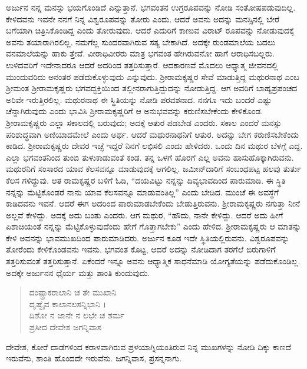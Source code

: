 ಅರ್ಜುನ ನನ್ನ ಮನಸ್ಸು ಭಯಗೊಂಡಿದೆ ಎನ್ನುತ್ತಾನೆ. ಭಗವಂತನ ಉಗ್ರರೂಪವನ್ನು ನೋಡಿ ಸಂತೋಷಪಡುವುದಿಲ್ಲ. ಕೇಳಿದವನು ಇವನೇ ನನಗೆ ನಿನ್ನ ವಿಶ್ವರೂಪವನ್ನು ತೋರು ಎಂದು. ಆದರೆ ಅವನು ಅದನ್ನು ಮನಸ್ಸಿನಲ್ಲಿ ಬೇರೆ ಬಗೆಯಾಗಿ ಚಿತ್ರಿಸಿಕೊಂಡಿದ್ದ ಎಂದು ತೋರುವುದು. ಆದರೆ ಎದುರಿಗೆ ಕಾಣುವ ವಿರಾಟ್ ರೂಪವನ್ನು ನೋಡುವುದಕ್ಕೆ ಅವನು ತಯಾರಾಗಿರಲಿಲ್ಲ. ನಮಗೆಲ್ಲ ಸುಂದರವಾಗಿರುವ ಸತ್ಯ ಬೇಕಾಗಿದೆ. ಅದಕ್ಕೇ ರುಂಡಮಾಲೆಯ ಬದಲು ವನಮಾಲೆಯನ್ನು ಹಾಕು ತ್ತೇವೆ. ವೀರಾಧಿವೀರರು ಮಾತ್ರ ಭಗವಂತ ಹೇಗಿರುವನೋ ಹಾಗೆ ಆರಾಧಿಸಬಲ್ಲರು. ಉಳಿದವರಿಗೆ ಇದೇನಾದರೂ ಆದರೆ ಅದರಿಂದ ತತ್ತರಿಸುತ್ತಾರೆ. ಆದಕಾರಣವೆ ಮೊದಲು ಆಧ್ಯಾತ್ಮ ಜೀವನದಲ್ಲಿ ಮುಂದುವರಿದು ಅನಂತರ ಪಡೆದುಕೊಳ್ಳುವುದು ಎನ್ನುವುದು. ಶ್ರೀರಾಮಕೃಷ್ಣರ ಸೇವೆ ಮಾಡುತ್ತಿದ್ದ ಮಥುರನಾಥ ಎಂಬ ಶ್ರೀಮಂತ ಶ್ರೀರಾಮಕೃಷ್ಣರು ಭಗವದ್ಭಕ್ತಿಯಿಂದ ತಲ್ಲೀನರಾಗುತ್ತಿದ್ದುದನ್ನು ನೋಡುತ್ತಿದ್ದ. ಆಗ ಅವರಿಗೆ ಬಾಹ್ಯಪ್ರಪಂಚದ ಅರಿವೇ ಇರುತ್ತಿರಲಿಲ್ಲ. ಮಥುರನಾಥ ಈ ಸ್ಥಿತಿಯನ್ನು ನೋಡಿ ಪರವಶನಾದ. ನನಗೂ ಇದು ಬಂದರೆ ಎಷ್ಟು ಚೆನ್ನಾಗಿರುವುದು ಎಂದು ಭಾವಿಸಿ ಶ್ರೀರಾಮಕೃಷ್ಣರಿಗೆ ಆ ಅನುಭವವನ್ನು ಕರುಣಿಸಬೇಕೆಂದು ಕೇಳಿಕೊಂಡ. ಶ್ರೀರಾಮಕೃಷ್ಣರು ಎಲ್ಲಾ ಸಕಾಲದಲ್ಲಿ ಬರುವುದು; ಅದಕ್ಕೆ ಆತುರ ಪಡಬೇಡ ಎಂದರು. ಸಕಾಲ ಎಂದರೆ ಮನಸ್ಸು ಪರಿಶುದ್ಧವಾಗಿ ಅಣಿಯಾದಮೇಲೆ ಎಂದು ಅರ್ಥ. ಆದರೆ ಮಥುರನಾಥನಿಗೆ ಆತುರ. ಅದನ್ನು ಬೇಗ ಕರುಣಿಸಬೇಕೆಂದು ಕಾಡಿದ. ಶ್ರೀರಾಮಕೃಷ್ಣರು ದೇವರ ಇಚ್ಛೆ ಇದ್ದರೆ ನಿನಗೆ ಲಭಿಸಲಿ ಎಂದು ಹೇಳಿದರು. ಒಂದು ದಿನ ಮಥುರ ಬೆಳಗ್ಗೆ ಎದ್ದ. ಎಲ್ಲಾ ಭಗವಂತನಿಂದ ತುಂಬಿ ತುಳುಕಾಡುವಂತೆ ಕಂಡ. ತನ್ನ ಒಳಗೆ ಹೊರಗೆ ಎಲ್ಲ ಅವನು ಹಾಸುಹೊಕ್ಕಾಗಿರುವನು. ಮಥುರನಿಗೆ ಸಂಸಾರದ ಯಾವ ಕೆಲಸವನ್ನೂ ಮಾಡುವುದಕ್ಕೆ ಆಗಲಿಲ್ಲ. ಜಮೀನ್​ದಾರಿಗೆ ಸಂಬಂಧಪಟ್ಟ ಹಲವು ತುರ್ತು ಕೆಲಸ ಗಳಿದ್ದುವು. ಆತ ರಾಮಕೃಷ್ಣರ ಬಳಿಗೆ ಓಡಿ, “ದಯವಿಟ್ಟು ನನ್ನನ್ನು ದಿವ್ಯಭಾವದಿಂದ ಪಾರುಮಾಡಿ. ಈ ಸ್ಥಿತಿ ನನ್ನನ್ನು ಮೆಟ್ಟಿಕೊಂಡರೆ ನಾನು ಯಾವ ಕೆಲಸವನ್ನೂ ಮಾಡುವಂತಿಲ್ಲ” ಎಂದು ಬೇಡಿದ. ಮುಂಚೆ ಈ ಅವಸ್ಥೆಗೆ ಕಾಡಿದವನು ಇವನೆ. ಆದರೆ ಈಗ ಅದರಿಂದ ಪಾರುಮಾಡಬೇಕೆಂದು ಬೇಡುತ್ತಿರುವನು. ಶ್ರೀರಾಮಕೃಷ್ಣರು ನಗುತ್ತಾ ನೀನೆ ಅಲ್ಲವೆ ಕೇಳಿದ್ದು. ಅದಕ್ಕೆ ಅದು ಬಂತು ಎಂದರು. ಆಗ ಮಥುರ, “ಹೌದು, ನಾನೇ ಕೇಳಿದ್ದು. ಆದರೆ ಅದು ಹೀಗೆ ಪಿಶಾಚಿಯಂತೆ ನನ್ನನ್ನು ಮೆಟ್ಟಿಕೊಳ್ಳುವುದೆಂದು ಹೇಗೆ ಗೊತ್ತಾಗಬೇಕು” ಎಂದು ಹೇಳಿದ. ಶ್ರೀರಾಮಕೃಷ್ಣರು ಆ ಮಾತನ್ನು ಕೇಳಿ ಅವನನ್ನು ಭಾವಮುಖದಿಂದ ಪಾರುಮಾಡಿದರು. ಅರ್ಜುನ ಕೂಡ ಇದೇ ಸ್ಥಿತಿಯಲ್ಲಿರುವನು. ವಿಶ್ವರೂಪವನ್ನು ತೋರೆಂದು ಕೇಳಿಕೊಂಡವನು ಇವನು. ಭಗವಂತ ಕೊಟ್ಟ, ಆದರೆ ಅದನ್ನು ನೋಡಿದಾಗ ತರಗೆಲೆ ಬಿರುಗಾಳಿಗೆ ತತ್ತರಿಸುವಂತೆ ತತ್ತರಿಸುತ್ತಾನೆ. ಏಕೆಂದರೆ ಇನ್ನೂ ಅವನು ಆಧ್ಯಾತ್ಮಿಕ ಸಾಧನೆಮಾಡಿ ಯೋಗ್ಯತೆಯನ್ನು ಪಡೆದುಕೊಂಡಿಲ್ಲ. ಅದಕ್ಕೇ ಅರ್ಜುನನ ಧೈರ್ಯ ಮತ್ತು ಶಾಂತಿ ಕುಂದುವುದು.

\begin{verse}
ದಂಷ್ಟ್ರಾಕರಾಲಾನಿ ಚ ತೇ ಮುಖಾನಿ \\ ದೃಷ್ವೈವ ಕಾಲಾನಲಸನ್ನಿಭಾನಿ ।\\ದಿಶೋ ನ ಜಾನೇ ನ ಲಭೇ ಚ ಶರ್ಮ \\ ಪ್ರಸೀದ ದೇವೇಶ ಜಗನ್ನಿವಾಸ 
\end{verse}

{\small ದೇವೇಶ, ಕೋರೆ ದಾಡೆಗಳಿಂದ ಕರಾಳವಾಗಿರುವ ಪ್ರಳಯಾಗ್ನಿಯಂತಿರುವ ನಿನ್ನ ಮುಖಗಳನ್ನು ನೋಡಿ ದಿಕ್ಕು ಕಾಣದೆ ಇರುವೆನು, ಶಾಂತಿ ಹೊಂದದೇ ಇರುವೆನು. ಜಗನ್ನಿವಾಸ, ಪ್ರಸನ್ನನಾಗು.}

